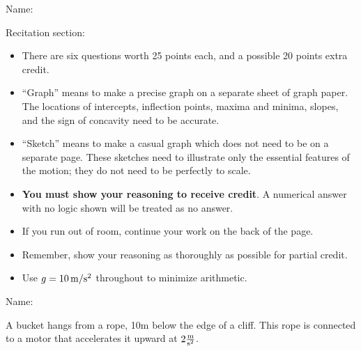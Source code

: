 \documentclass[12pt]{article}
\begin{document}
\bigskip
\bigskip
\bigskip
\bigskip

\Large \centerline{}


\vspace{2in}


\hspace{1in} Name: \underline{\hspace{3in}}

\bigskip
\bigskip

\hspace{1in} Recitation section: \underline{\hspace{1.8in}}

\normalsize

\vspace{1.4in}

\begin{itemize}
  \item{There are six questions worth 25 points each, and a possible 20 points extra credit.}
  \item{``Graph'' means to make a precise graph on a separate sheet of graph paper. The locations of intercepts, inflection points, maxima and minima, slopes, and the sign of concavity need to be accurate.}
  \item{``Sketch'' means to make a casual graph which does not need to be on a separate page. These sketches need to illustrate only the essential features of the motion; they do not
    need to be perfectly to scale.}
  \item{{\bf You must show your reasoning to receive credit}. A numerical answer with no logic shown will be treated as no answer.}
  \item{If you run out of room, continue your work on the back of the page.}
  \item{Remember, show your reasoning as thoroughly as possible for partial credit.}
  \item{Use $g=10\, \rm m/\rm s^2$ throughout to minimize arithmetic.}
\end{itemize}
\newpage
\small

\begin{flushright}
  Name: \underline{\hspace{3in}}
\end{flushright}

\Large \centerline{}
\normalsize

A bucket hangs from a rope, 10m below the edge of a cliff. This rope is connected to a motor that accelerates it upward at $2 \frac{\rm m}{\rm s^2}$.
\end{document}
